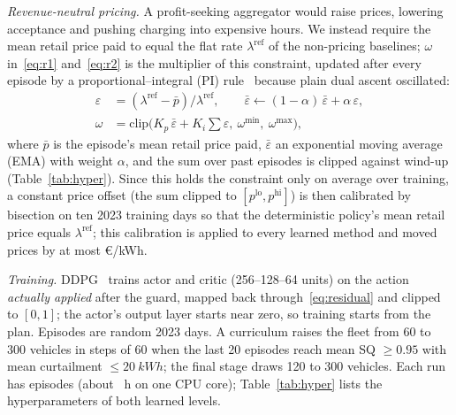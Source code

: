 \documentclass[journal]{IEEEtran}
\begin{document}
\emph{Revenue-neutral pricing.} A profit-seeking aggregator would raise prices,
lowering acceptance and pushing charging into expensive hours. We instead
require the mean retail price paid to equal the flat rate
$\lambda^{\mathrm{ref}}$ of the non-pricing baselines; $\omega$
in~\eqref{eq:r1} and~\eqref{eq:r2} is the multiplier of this constraint,
updated after every episode by a proportional--integral (PI)
rule~\cite{stooke2020pid} because plain dual ascent oscillated:
\begin{align}
\varepsilon&=(\lambda^{\mathrm{ref}}-\bar p)/\lambda^{\mathrm{ref}},\qquad \bar\varepsilon\leftarrow(1-\alpha)\,\bar\varepsilon+\alpha\,\varepsilon,\nonumber\\
\omega&=\mathrm{clip}\Big(K_p\,\bar\varepsilon+K_i\textstyle\sum\varepsilon,\ \omega^{\min},\ \omega^{\max}\Big),
\end{align}
where $\bar p$ is the episode's mean retail price paid, $\bar\varepsilon$ an
exponential moving average (EMA) with weight $\alpha$, and the sum over past
episodes is clipped against wind-up (Table~\ref{tab:hyper}). Since this holds
the constraint only on average over training, a constant price offset (the sum
clipped to $[p^{\mathrm{lo}},p^{\mathrm{hi}}]$) is then calibrated by bisection
on ten 2023 training days so that the deterministic policy's mean retail price
equals $\lambda^{\mathrm{ref}}$; this calibration is applied to every learned
method and moved prices by at most \euro\GCalibOffsetAbsmax/kWh.

\emph{Training.} DDPG~\cite{lillicrap2016} trains actor and critic
(256--128--64 units) on the action \emph{actually applied} after the guard,
mapped back through~\eqref{eq:residual} and clipped to $[0,1]$; the actor's
output layer starts near zero, so training starts from the plan. Episodes are
random 2023 days. A curriculum raises the fleet from 60 to 300 vehicles in
steps of 60 when the last 20 episodes reach mean SQ $\ge0.95$ with mean
curtailment $\le\SI{20}{kWh}$; the final stage draws 120 to 300 vehicles.
Each run has \GTrainEpisodes{} episodes (about \GTrainHoursNested~h on one CPU
core); Table~\ref{tab:hyper} lists the hyperparameters of both learned
levels.

\begin{table}[t]
\centering
\caption{Hyperparameters, Read From the Configuration File and the Code}
\label{tab:hyper}
\footnotesize

\end{table}
\end{document}
